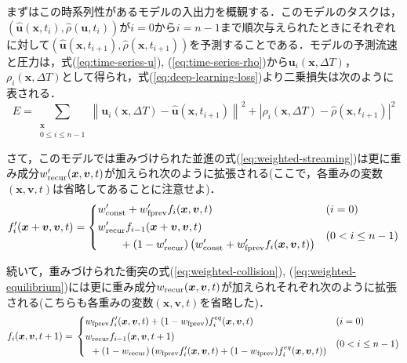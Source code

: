まずはこの時系列性があるモデルの入出力を概観する．このモデルのタスクは，$(\hat{\bm{u}}(\bm{x}, t_i), \hat{\rho}(\bm{u}, t_i))$が$i = 0$から$i = n-1$まで順次与えられたときにそれぞれに対して$(\hat{\bm{u}}(\bm{x}, t_{i+1}), \hat{\rho}(\bm{x}, t_{i+1}))$を予測することである．モデルの予測流速と圧力は，式(\ref{eq:time-series-u}), (\ref{eq:time-series-rho})から$\bm{u}_i(\bm{x}, \Delta T)$，$\rho_i(\bm{x}, \Delta T)$として得られ，式(\ref{eq:deep-learning-loss})より二乗損失は次のように表される．
\begin{equation}
  E = \sum_{\substack{\bm{x} \\ 0 \leq i \leq n-1}} 
  \left\| \bm{u}_i(\bm{x}, \Delta T) - \hat{\bm{u}}(\bm{x}, t_{i+1}) \right\|^2 +
  \left| \rho_i(\bm{x}, \Delta T) - \hat{\rho}(\bm{x}, t_{i+1}) \right|^2
  \label{eq:error-function-time-series}
\end{equation}

 さて，このモデルでは重みづけられた並進の式(\ref{eq:weighted-streaming})は更に重み成分$w'_{\rm{recur}}(\bm{x}, \bm{v}, t)$が加えられ次のように拡張される(ここで，各重みの変数$(\bm{x}, \bm{v}, t)$は省略してあることに注意せよ)．
\begin{equation}
  f_i'(\bm{x}+\bm{v}, \bm{v}, t) =
  \begin{dcases}
    w'_{\rm{const}} + w'_{\rm{fprev}} f_i(\bm{x}, \bm{v}, t)
    & (i = 0) \\
    \begin{split}
      & w'_{\rm{recur}} f_{i-1}(\bm{x} + \bm{v}, \bm{v}, t) \\
      & \qquad + (1 - w'_{\rm{recur}})
      \left(
        w'_{\rm{const}} + w'_{\rm{fprev}} f_i(\bm{x}, \bm{v}, t)
      \right)
    \end{split}
    & (0 < i \leq n-1)
  \end{dcases}
  \label{eq:weighted-streaming-time-series}
\end{equation}

続いて，重みづけられた衝突の式(\ref{eq:weighted-collision}), (\ref{eq:weighted-equilibrium})には更に重み成分$w_{\rm{recur}}(\bm{x}, \bm{v}, t)$が加えられそれぞれ次のように拡張される(こちらも各重みの変数$(\bm{x}, \bm{v}, t)$を省略した)．
\begin{equation}
  f_i(\bm{x}, \bm{v}, t + 1) = \\
  \begin{dcases}
    w_{\rm{fprev}} f_i'(\bm{x}, \bm{v}, t)
    + (1 - w_{\rm{fprev}}) f_i^{eq}(\bm{x}, \bm{v}, t)
    & (i = 0) \\
    \begin{split}
      & w_{\rm{recur}} f_{i-1}(\bm{x}, \bm{v}, t + 1) \\
      & \hspace{5pt} + (1 - w_{\rm{recur}})
      \left(
        w_{\rm{fprev}} f_i'(\bm{x}, \bm{v}, t)
        + (1 - w_{\rm{fprev}}) f_i^{eq}(\bm{x}, \bm{v}, t)
      \right)
    \end{split}
    & (0 < i \leq n-1)
  \end{dcases}
  \label{eq:weighted-collision-time-series}
\end{equation}

